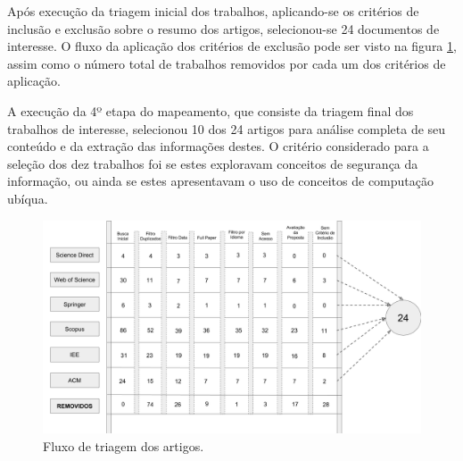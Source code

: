 \documentclass[ti,table]{texufpel} %
\begin{document}
  

  

Após execução da triagem inicial dos trabalhos, aplicando-se os critérios de inclusão e exclusão sobre o resumo dos artigos, selecionou-se 24 documentos de interesse. O fluxo da aplicação dos critérios de exclusão pode ser visto na figura \ref{fig:grafFluxoTriagemInicial}, assim como o número total de trabalhos removidos por cada um dos critérios de aplicação.  

  

A execução da 4º etapa do mapeamento, que consiste da triagem final dos trabalhos de interesse, selecionou 10 dos 24 artigos para análise completa de seu conteúdo e da extração das informações destes. O critério considerado para a seleção dos dez trabalhos foi se estes exploravam conceitos de segurança da informação, ou ainda se estes apresentavam o uso de conceitos de computação ubíqua.  

  

  

\begin{landscape} 

\begin{figure}[ht] 

    \centering 

    \includegraphics[width=1.7\textwidth]{imagens/FluxoTriagemInicial.png} 

    \caption{Fluxo de triagem dos artigos.} 

    \label{fig:grafFluxoTriagemInicial} 

\end{figure} 

\end{landscape} 

  

  
\end{document}
